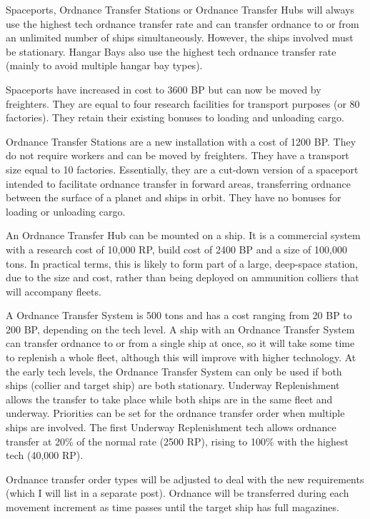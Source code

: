 \documentclass[../Aurora C# unofficial manual.tex]{subfiles}
\begin{document}
	Spaceports, Ordnance Transfer Stations or Ordnance Transfer Hubs will always use the highest tech ordnance transfer rate and can transfer ordnance to or from an unlimited number of ships simultaneously. However, the ships involved must be stationary. Hangar Bays also use the highest tech ordnance transfer rate (mainly to avoid multiple hangar bay types).
	
	Spaceports have increased in cost to 3600 BP but can now be moved by freighters. They are equal to four research facilities for transport purposes (or 80 factories). They retain their existing bonuses to loading and unloading cargo.
	
	Ordnance Transfer Stations are a new installation with a cost of 1200 BP. They do not require workers and can be moved by freighters. They have a transport size equal to 10 factories. Essentially, they are a cut-down version of a spaceport intended to facilitate ordnance transfer in forward areas, transferring ordnance between the surface of a planet and ships in orbit. They have no bonuses for loading or unloading cargo.
	
	An Ordnance Transfer Hub can be mounted on a ship. It is a commercial system with a research cost of 10,000 RP, build cost of 2400 BP and a size of 100,000 tons. In practical terms, this is likely to form part of a large, deep-space station, due to the size and cost, rather than being deployed on ammunition colliers that will accompany fleets.
	
	A Ordnance Transfer System is 500 tons and has a cost ranging from 20 BP to 200 BP, depending on the tech level. A ship with an Ordnance Transfer System can transfer ordnance to or from a single ship at once, so it will take some time to replenish a whole fleet, although this will improve with higher technology. At the early tech levels, the Ordnance Transfer System can only be used if both ships (collier and target ship) are both stationary. Underway Replenishment allows the transfer to take place while both ships are in the same fleet and underway. Priorities can be set for the ordnance transfer order when multiple ships are involved. The first Underway Replenishment tech allows ordnance transfer at 20\% of the normal rate (2500 RP), rising to 100\% with the highest tech (40,000 RP).
	
	Ordnance transfer order types will be adjusted to deal with the new requirements (which I will list in a separate post). Ordnance will be transferred during each movement increment as time passes until the target ship has full magazines.
	
\end{document}
